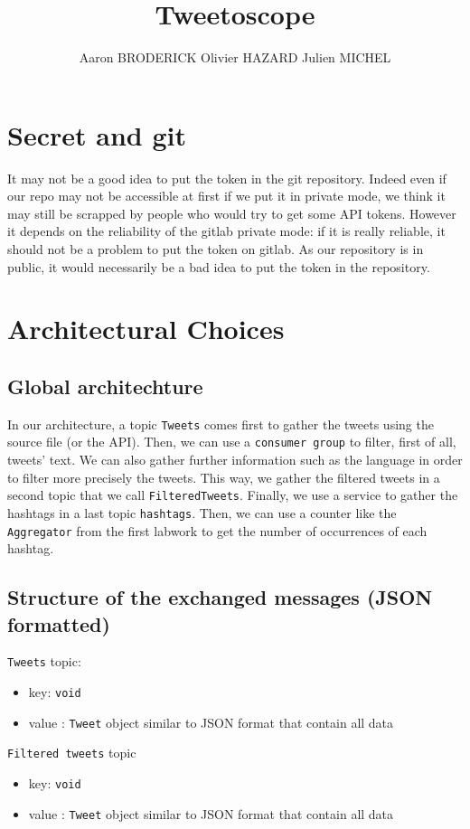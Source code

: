 \documentclass[10pt,a4paper]{article}
\author{Aaron BRODERICK Olivier HAZARD Julien MICHEL}
\title{Tweetoscope}
\begin{document}
\maketitle

\section{Secret and git}
\qquad 
It may not be a good idea to put the token in the git repository. Indeed even if our repo may not be accessible at first if we put it in private mode, we think it may still be scrapped by people who would try to get some API tokens. However it depends on the reliability of the gitlab private mode: if it is really reliable, it should not be a problem to put the token on gitlab. As our repository is in public, it would necessarily be a bad idea to put the token in the repository.

\section{Architectural Choices}
\subsection{Global architechture}
\qquad
In our architecture, a topic \texttt{Tweets} comes first to gather the tweets using the source file (or the API). Then, we can use a \texttt{consumer group} to filter, first of all, tweets' text. We can also gather further information such as the language in order to filter more precisely the tweets. This way, we gather the filtered tweets in a second topic that we call \texttt{FilteredTweets}. Finally, we use a service to gather the hashtags in a last topic \texttt{hashtags}. Then, we can use a counter like the \texttt{Aggregator} from the first labwork to get the number of occurrences of each hashtag.

\subsection{Structure of the exchanged messages (JSON formatted)}
\texttt{Tweets} topic:
\begin{itemize}
    \item key: \texttt{void}
    \item value : \texttt{Tweet} object similar to JSON format that contain all data
\end{itemize}

\texttt{Filtered tweets} topic
\begin{itemize}
    \item key: \texttt{void}
    \item value : \texttt{Tweet} object similar to JSON format that contain all data
\end{itemize}
\end{document}
